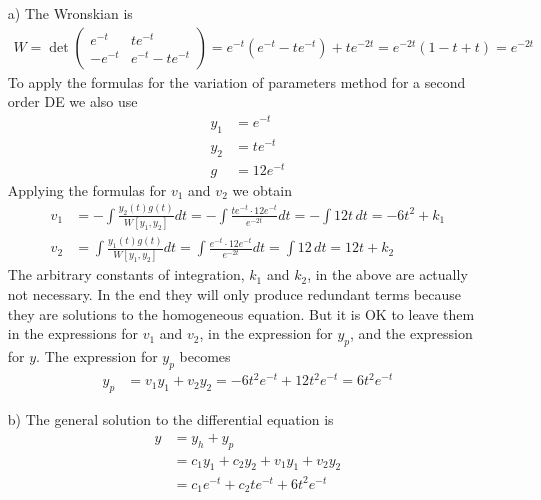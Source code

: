     \ifnum {} {\color{DarkBlue} 
    \begin{enumerate}
        \item[a)] The Wronskian is
    \begin{align}
        W = \det \begin{pmatrix} e^{-t}&te^{-t}\\-e^{-t}&e^{-t}-te^{-t}\end{pmatrix} = e^{-t}(e^{-t}-te^{-t})+te^{-2t} = e^{-2t}(1 -t+t) = e^{-2t}
    \end{align}
    To apply the formulas for the variation of parameters method for a second order DE we also use
    \begin{align}
        y_1 & = e^{-t} \\
        y_2 &= te^{-t} \\
        g &= 12e^{-t}
    \end{align}
    Applying the formulas for $v_1$ and $v_2$ we obtain
    \begin{align}
        v_1 &= - \int \frac{y_2(t)g(t)}{W[y_1,y_2]}dt = - \int \frac{te^{-t} \cdot 12e^{-t}}{e^{-2t}} dt = - \int 12t \, dt = -6t^2 + k_1\\
        v_2 &= \int \frac{y_1(t)g(t)}{W[y_1,y_2]} dt = \int \frac{e^{-t}\cdot12e^{-t}}{e^{-2t}} dt = \int 12 \, dt = 12t + k_2
    \end{align}
    The arbitrary constants of integration, $k_1$ and $k_2$, in the above are actually not necessary. In the end they will only produce redundant terms because they are solutions to the homogeneous equation. But it is OK to leave them in the expressions for $v_1$ and $v_2$, in the expression for $y_p$, and the expression for $y$. The expression for $y_p$ becomes
    \begin{align}
        y_p &= v_1y_1 + v_2y_2 
        = -6t^2 e^{-t} + 12t^2e^{-t} = 6t^2e^{-t}
    \end{align}
    \item [b)] The general solution to the differential equation is
    \begin{align}
        y &= y_h + y_p \\
        &= c_1y_1 + c_2y_2 + v_1y_1 + v_2y_2 \\
        &= c_1e^{-t} +c_2te^{-t} + 6t^2e^{-t}
    \end{align}
    \end{enumerate}
    } 
    \else 
    \fi    
\fi






